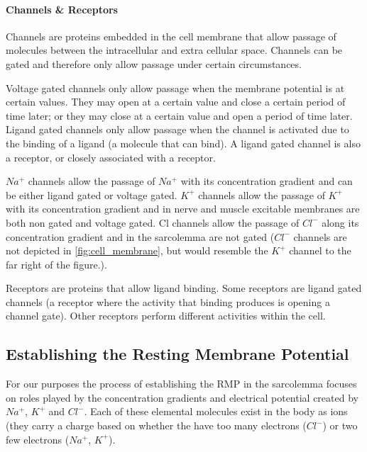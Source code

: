 \paragraph{Channels \& Receptors}
Channels are proteins embedded in the cell membrane that allow passage of molecules between the intracellular and extra cellular space. Channels can be gated and therefore only allow passage under certain circumstances. 

Voltage gated channels only allow passage when the membrane potential is at certain values. They may open at a certain value and close a certain period of time later; or they may close at a certain value and open a period of time later. 
Ligand gated channels only allow passage when the channel is activated due to the binding of a ligand (a molecule that can bind). A ligand gated channel is also a receptor, or closely associated with a receptor. 

$Na^+$ channels allow the passage of $Na^+$ with its concentration gradient and can be either ligand gated or voltage gated. $K^+$ channels allow the passage of $K^+$ with its concentration gradient and in nerve and muscle excitable membranes are both non gated and voltage gated. Cl channels allow the passage of $Cl^-$ along its concentration gradient and in the sarcolemma are not gated ($Cl^-$ channels are not depicted in \ref{fig:cell_membrane}, but would resemble the $K^+$ channel to the far right of the figure.).

Receptors are proteins that allow ligand binding. Some receptors are ligand gated channels (a receptor where the activity that binding produces is opening a channel gate). Other receptors perform different activities within the cell. 


\subsection{Establishing the Resting Membrane Potential}

For our purposes the process of establishing the RMP in the sarcolemma focuses on roles played by the concentration gradients and electrical potential created by $Na^+$, $K^+$ and $Cl^-$. Each of these elemental molecules exist in the body as ions (they carry a charge based on whether the have too many electrons ($Cl^-$) or two few electrons ($Na^+$, $K^+$).\footnotemark{} 

